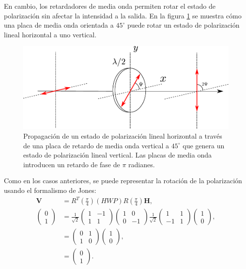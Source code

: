 En cambio, los retardadores de media onda permiten rotar el estado de
polarización sin afectar la intensidad a la salida. En la
figura \ref{fig:hwp_retarder} se muestra cómo una placa de media onda
orientada a $45^{\circ}$ puede rotar un estado de polarización lineal
horizontal a uno vertical. 
\begin{figure}[h!]
\centering
\includegraphics[scale=.7]{HWP_retarder}
\caption[Generación de estados de polarización lineales]{Propagación de un estado de polarización lineal horizontal a través de una placa de retardo de media onda
  vertical a $45^{\circ}$ que genera un estado de polarización lineal vertical. Las
placas de media onda introducen un retardo de fase de
$\pi$ radianes.}
\label{fig:hwp_retarder}
\end{figure}
Como en los casos anteriores, se puede representar la rotación de la
polarización usando el formalismo de Jones:
\begin{align*}
\mathbf{V} &=
R^{T}\left(\frac{\pi}{4}\right)\left(HWP\right)R\left(\frac{\pi}{4}\right)\mathbf{H},\\ 
\begin{pmatrix}
0\\1
\end{pmatrix}&=
 \frac{1}{\sqrt{2}}
\begin{pmatrix}
  1 &-1\\1&1
\end{pmatrix}
\begin{pmatrix} 1
  &0\\0&-1 \end{pmatrix}
 \frac{1}{\sqrt{2}}
\begin{pmatrix}
1&1\\-1&1
\end{pmatrix}
\begin{pmatrix}
1\\ 0
\end{pmatrix},
\\
&=
\begin{pmatrix}
0  & 1 \\1 & 0
\end{pmatrix}
\begin{pmatrix}
1\\ 0
\end{pmatrix},\\&=
\begin{pmatrix}
0\\1
\end{pmatrix}.
\end{align*}
